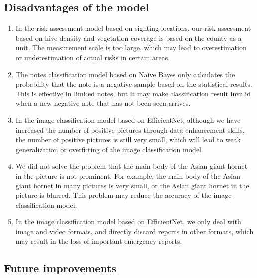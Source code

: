 \documentclass{mcmthesis}
\numberwithin{figure}{section}
\numberwithin{table}{section}
\begin{document}
\subsection{Disadvantages of the model}
\begin{enumerate}
  \item In the risk assessment model based on sighting locations, our risk assessment based on hive density and vegetation coverage is based on the county as a unit. The measurement scale is too large, which may lead to overestimation or underestimation of actual risks in certain areas.
  \item The notes classification model based on Naive Bayes only calculates the probability that the note is a negative sample based on the statistical results. This is effective in limited notes, but it may make classification result invalid when a new negative note that has not been seen arrives.
  \item In the image classification model based on EfficientNet, although we have increased the number of positive pictures through data enhancement skills, the number of positive pictures is still very small, which will lead to weak generalization or overfitting of the image classification model.
  \item We did not solve the problem that the main body of the Asian giant hornet in the picture is not prominent. For example, the main body of the Asian giant hornet in many pictures is very small, or the Asian giant hornet in the picture is blurred. This problem may reduce the accuracy of the image classification model.
  \item In the image classification model based on EfficientNet, we only deal with image and video formats, and directly discard reports in other formats, which may result in the loss of important emergency reports.
\end{enumerate}

\subsection{Future improvements}
\end{document}
